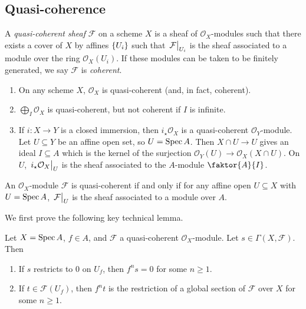 \subsection{Quasi-coherence}
\begin{definition}
    A \emph{quasi-coherent sheaf} \( \mathcal F \) on a scheme \( X \) is a sheaf of \( \mathcal O_X \)-modules such that there exists a cover of \( X \) by affines \( \qty{U_i} \) such that \( \eval{\mathcal F}_{U_i} \) is the sheaf associated to a module over the ring \( \mathcal O_X(U_i) \).
    If these modules can be taken to be finitely generated, we say \( \mathcal F \) is \emph{coherent}.
\end{definition}
\begin{example}
    \begin{enumerate}
        \item On any scheme \( X \), \( \mathcal O_X \) is quasi-coherent (and, in fact, coherent).
        \item \( \bigoplus_I \mathcal O_X \) is quasi-coherent, but not coherent if \( I \) is infinite.
        \item If \( i : X \to Y \) is a closed immersion, then \( i_\star \mathcal O_X \) is a quasi-coherent \( \mathcal O_Y \)-module.
        Let \( U \subseteq Y \) be an affine open set, so \( U = \operatorname{Spec} A \).
        Then \( X \cap U \to U \) gives an ideal \( I \subseteq A \) which is the kernel of the surjection \( \mathcal O_Y(U) \to \mathcal O_X(X \cap U) \).
        On \( U \), \( \eval{i_\star \mathcal O_X}_U \) is the sheaf associated to the \( A \)-module \( \faktor{A}{I} \).
    \end{enumerate}
\end{example}
\begin{proposition}
    An \( \mathcal O_X \)-module \( \mathcal F \) is quasi-coherent if and only if for any affine open \( U \subseteq X \) with \( U = \operatorname{Spec} A \), \( \eval{\mathcal F}_U \) is the sheaf associated to a module over \( A \).
\end{proposition}
We first prove the following key technical lemma.
\begin{lemma}
    Let \( X = \operatorname{Spec} A \), \( f \in A \), and \( \mathcal F \) a quasi-coherent \( \mathcal O_X \)-module.
    Let \( s \in \Gamma(X, \mathcal F) \).
    Then
    \begin{enumerate}
        \item If \( s \) restricts to 0 on \( U_f \), then \( f^n s = 0 \) for some \( n \geq 1 \).
        \item If \( t \in \mathcal F(U_f) \), then \( f^n t \) is the restriction of a global section of \( \mathcal F \) over \( X \) for some \( n \geq 1 \).
    \end{enumerate}
\end{lemma}
